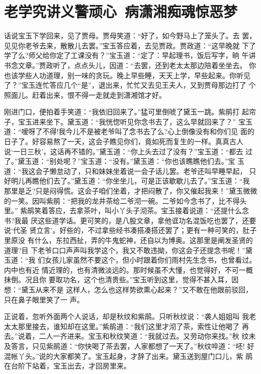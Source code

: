 \chapter{老学究讲义警顽心~病潇湘痴魂惊恶梦}

话说宝玉下学回来，见了贾母。贾母笑道：“好了，如今野马上了笼头了。去
罢，见见你老爷去来，散散儿去罢。”宝玉答应着，去见贾政。贾政道：“这早晚就
下了学了么?师父给你定了工课没有？”宝玉道：“定了：早起理书，饭后写字，晌
午讲书念文章。”贾政听了，点点头儿，因道：“去罢，还到老太太那边陪着坐坐去。
你也该学些人功道理，别一味的贪玩。晚上早些睡，天天上学，早些起来。你听见
了？”宝玉连忙答应几个“是”，退出来，忙忙又去见王夫人，又到贾母那边打了
个照面儿。赶着出来，恨不得一走就走到潇湘馆才好。

刚进门口，便拍着手笑道：“我依旧回来了。”猛可里倒唬了黛玉一跳。紫鹃打
起帘子，宝玉进来坐下。黛玉道：“我恍惚听见你念书去了，这么早就回来了？”
宝玉道：“嗳呀了不得!我今儿不是被老爷叫了念书去了么?心上倒像没有和你们见
面的日子了。好容易熬了一天，这会子瞧见你们，竟如死而复生的一样。真真古人
说‘一日三秋’，这话再不错的。”黛玉道：“你上头去过了没有？”宝玉道：“都去
过了。”黛玉道：“别处呢？”宝玉道：“没有。”黛玉道：“你也该瞧瞧他们去。”宝
玉道：“我这会子懒怠动了，只和妹妹坐着说一会子话儿罢。老爷还叫早睡早起，
只好明儿再瞧他们去了。”黛玉道：“你坐坐儿，可是正该歇歇儿去了。”宝玉道：“我
那里是乏?只是闷得慌。这会子咱们坐着，才把闷散了，你又催起我来！”黛玉微微
的一笑。因叫紫鹃：“把我的龙井茶给二爷沏一碗。二爷如今念书了，比不得头里。”
紫鹃笑着答应，去拿茶叶，叫小丫头子沏茶。宝玉接着说道：“还提什么念书?我最
厌这些道学话。更可笑的，是八股文章，拿他诓功名混饭吃也罢了，还要说‘代圣
贤立言’。好些的，不过拿些经书凑搭凑搭还罢了；更有一种可笑的，肚子里原没
有什么，东拉西扯，弄的牛鬼蛇神，还自以为博奥。这那里是阐发圣贤的道理?目
下老爷口口声声叫我学这个，我又不敢违拗，你这会子还提念书呢！”黛玉道：“我
们女孩儿家虽然不要这个，但小时跟着你们雨村先生念书，也曾看过。内中也有近
情近理的，也有清微淡远的。那时候虽不大懂，也觉得好，不可一概抹倒。况且你
要取功名，这个也清贵些。”宝玉听到这里，觉得不甚入耳，因想：“黛玉从来不是
这样人，怎么也这样势欲熏心起来？”又不敢在他跟前驳回，只在鼻子眼里笑了一
声。

正说着，忽听外面两个人说话，却是秋纹和紫鹃。只听秋纹说：“袭人姐姐叫
我老太太那里接去，谁知却在这里。”紫鹃道：“我们这里才沏了茶，索性让他喝了
再去。”说着，二人一齐进来。宝玉和秋纹笑道：“我就过去。又劳动你来找。”秋
纹未及答言，只见紫鹃道：“你快喝了茶去罢，人家都想了一天了。”秋纹啐道：“呸!
好混帐丫头。”说的大家都笑了。宝玉起身，才辞了出来。黛玉送到屋门口儿，紫
鹃在台阶下站着，宝玉出去，才回房里来。

